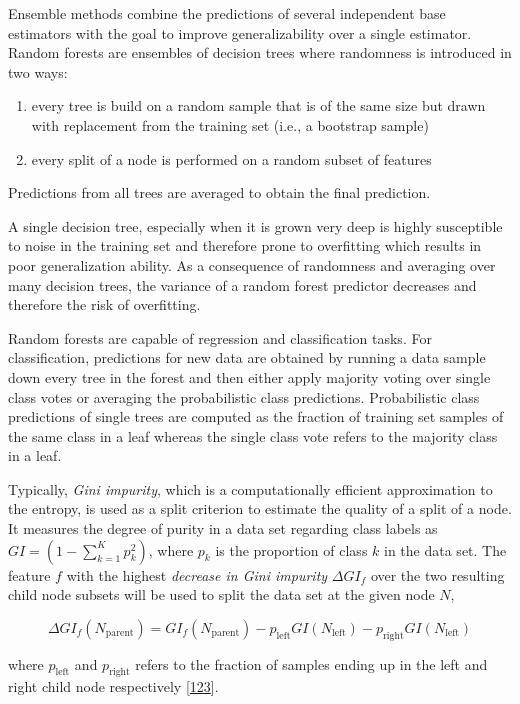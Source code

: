 \documentclass[12pt,a4paper,twoside]{book}
\providecommand{\tightlist}{%
  \setlength{\itemsep}{0pt}\setlength{\parskip}{0pt}}
\theoremstyle{definition}
\theoremstyle{definition}
\theoremstyle{remark}
\begin{document}
Ensemble methods combine the predictions of several independent base
estimators with the goal to improve generalizability over a single
estimator. Random forests are ensembles of decision trees where
randomness is introduced in two ways:

\begin{enumerate}
\def\labelenumi{\arabic{enumi}.}
\tightlist
\item
  every tree is build on a random sample that is of the same size but
  drawn with replacement from the training set (i.e., a bootstrap
  sample)
\item
  every split of a node is performed on a random subset of features
\end{enumerate}

Predictions from all trees are averaged to obtain the final prediction.

A single decision tree, especially when it is grown very deep is highly
susceptible to noise in the training set and therefore prone to
overfitting which results in poor generalization ability. As a
consequence of randomness and averaging over many decision trees, the
variance of a random forest predictor decreases and therefore the risk
of overfitting.

Random forests are capable of regression and classification tasks. For
classification, predictions for new data are obtained by running a data
sample down every tree in the forest and then either apply majority
voting over single class votes or averaging the probabilistic class
predictions. Probabilistic class predictions of single trees are
computed as the fraction of training set samples of the same class in a
leaf whereas the single class vote refers to the majority class in a
leaf.

Typically, \emph{Gini impurity}, which is a computationally efficient
approximation to the entropy, is used as a split criterion to estimate
the quality of a split of a node. It measures the degree of purity in a
data set regarding class labels as \(GI = (1 - \sum_{k=1}^K p_k^2)\),
where \(p_k\) is the proportion of class \(k\) in the data set. The
feature \(f\) with the highest \emph{decrease in Gini impurity}
\(\Delta GI_f\) over the two resulting child node subsets will be used
to split the data set at the given node \(N\),

\[
\Delta GI_f(N_{\textrm{parent}}) = GI_f(N_{\textrm{parent}}) - p_{\textrm{left}} GI(N_{\textrm{left}}) - p_{\textrm{right}} GI(N_{\textrm{left}})
\]

where \(p_{\textrm{left}}\) and \(p_{\textrm{right}}\) refers to the
fraction of samples ending up in the left and right child node
respectively {[}\protect\hyperlink{ref-Menze2009}{123}{]}.
\end{document}
